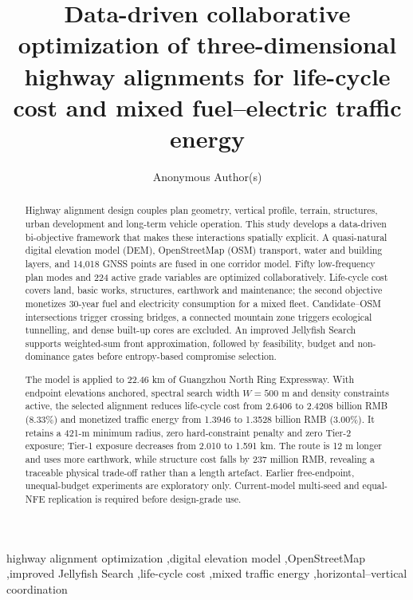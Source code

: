 \documentclass[preprint,12pt]{elsarticle}
\begin{document}
\begin{frontmatter}

\title{Data-driven collaborative optimization of three-dimensional highway alignments for life-cycle cost and mixed fuel--electric traffic energy}

\author[aff1]{Anonymous Author(s)}

\begin{abstract}
Highway alignment design couples plan geometry, vertical profile, terrain, structures, urban development and long-term vehicle operation. This study develops a data-driven bi-objective framework that makes these interactions spatially explicit. A quasi-natural digital elevation model (DEM), OpenStreetMap (OSM) transport, water and building layers, and 14,018 GNSS points are fused in one corridor model. Fifty low-frequency plan modes and 224 active grade variables are optimized collaboratively. Life-cycle cost covers land, basic works, structures, earthwork and maintenance; the second objective monetizes 30-year fuel and electricity consumption for a mixed fleet. Candidate--OSM intersections trigger crossing bridges, a connected mountain zone triggers ecological tunnelling, and dense built-up cores are excluded. An improved Jellyfish Search supports weighted-sum front approximation, followed by feasibility, budget and non-dominance gates before entropy-based compromise selection.

The model is applied to 22.46 km of Guangzhou North Ring Expressway. With endpoint elevations anchored, spectral search width $W=500$ m and density constraints active, the selected alignment reduces life-cycle cost from 2.6406 to 2.4208 billion RMB (8.33\%) and monetized traffic energy from 1.3946 to 1.3528 billion RMB (3.00\%). It retains a 421-m minimum radius, zero hard-constraint penalty and zero Tier-2 exposure; Tier-1 exposure decreases from 2.010 to 1.591 km. The route is 12 m longer and uses more earthwork, while structure cost falls by 237 million RMB, revealing a traceable physical trade-off rather than a length artefact. Earlier free-endpoint, unequal-budget experiments are exploratory only. Current-model multi-seed and equal-NFE replication is required before design-grade use.
\end{abstract}

\begin{keyword}
highway alignment optimization \sep digital elevation model \sep OpenStreetMap \sep improved Jellyfish Search \sep life-cycle cost \sep mixed traffic energy \sep horizontal--vertical coordination
\end{keyword}
\end{frontmatter}
\end{document}
